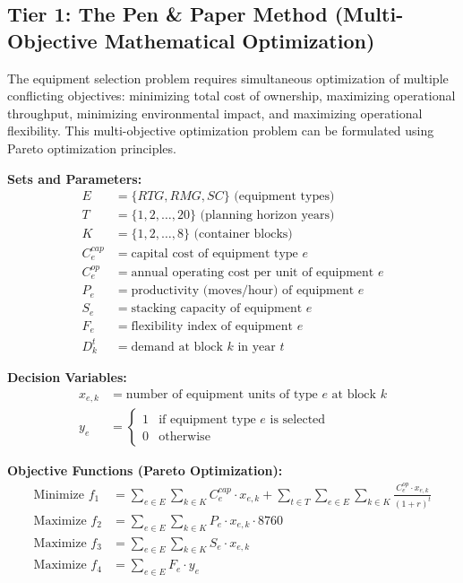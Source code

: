 \documentclass{article}
\begin{document}
\subsection{Tier 1: The Pen \& Paper Method (Multi-Objective Mathematical Optimization)}

The equipment selection problem requires simultaneous optimization of multiple conflicting objectives: minimizing total cost of ownership, maximizing operational throughput, minimizing environmental impact, and maximizing operational flexibility. This multi-objective optimization problem can be formulated using Pareto optimization principles.

\textbf{Sets and Parameters:}
\begin{align}
E &= \{RTG, RMG, SC\} \text{ (equipment types)} \\
T &= \{1, 2, \ldots, 20\} \text{ (planning horizon years)} \\
K &= \{1, 2, \ldots, 8\} \text{ (container blocks)} \\
C_e^{cap} &= \text{capital cost of equipment type } e \\
C_e^{op} &= \text{annual operating cost per unit of equipment } e \\
P_e &= \text{productivity (moves/hour) of equipment } e \\
S_e &= \text{stacking capacity of equipment } e \\
F_e &= \text{flexibility index of equipment } e \\
D_k^t &= \text{demand at block } k \text{ in year } t
\end{align}

\textbf{Decision Variables:}
\begin{align}
x_{e,k} &= \text{number of equipment units of type } e \text{ at block } k \\
y_e &= \begin{cases} 1 & \text{if equipment type } e \text{ is selected} \\ 0 & \text{otherwise} \end{cases}
\end{align}

\textbf{Objective Functions (Pareto Optimization):}
\begin{align}
\text{Minimize } f_1 &= \sum_{e \in E} \sum_{k \in K} C_e^{cap} \cdot x_{e,k} + \sum_{t \in T} \sum_{e \in E} \sum_{k \in K} \frac{C_e^{op} \cdot x_{e,k}}{(1+r)^t} \\
\text{Maximize } f_2 &= \sum_{e \in E} \sum_{k \in K} P_e \cdot x_{e,k} \cdot 8760 \\
\text{Maximize } f_3 &= \sum_{e \in E} \sum_{k \in K} S_e \cdot x_{e,k} \\
\text{Maximize } f_4 &= \sum_{e \in E} F_e \cdot y_e
\end{align}
\end{document}
